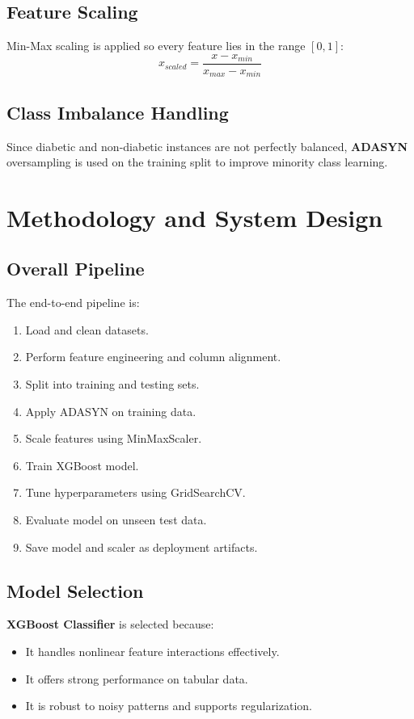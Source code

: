 \documentclass[12pt,a4paper]{report}
\begin{document}
\section{Feature Scaling}
Min-Max scaling is applied so every feature lies in the range $[0,1]$:
\[
x_{scaled} = \frac{x - x_{min}}{x_{max} - x_{min}}
\]

\section{Class Imbalance Handling}
Since diabetic and non-diabetic instances are not perfectly balanced, \textbf{ADASYN} oversampling is used on the training split to improve minority class learning.

\chapter{Methodology and System Design}

\section{Overall Pipeline}
The end-to-end pipeline is:
\begin{enumerate}[leftmargin=1.2cm]
    \item Load and clean datasets.
    \item Perform feature engineering and column alignment.
    \item Split into training and testing sets.
    \item Apply ADASYN on training data.
    \item Scale features using MinMaxScaler.
    \item Train XGBoost model.
    \item Tune hyperparameters using GridSearchCV.
    \item Evaluate model on unseen test data.
    \item Save model and scaler as deployment artifacts.
\end{enumerate}

\section{Model Selection}
\textbf{XGBoost Classifier} is selected because:
\begin{itemize}[leftmargin=1.2cm]
    \item It handles nonlinear feature interactions effectively.
    \item It offers strong performance on tabular data.
    \item It is robust to noisy patterns and supports regularization.
\end{itemize}
\end{document}
